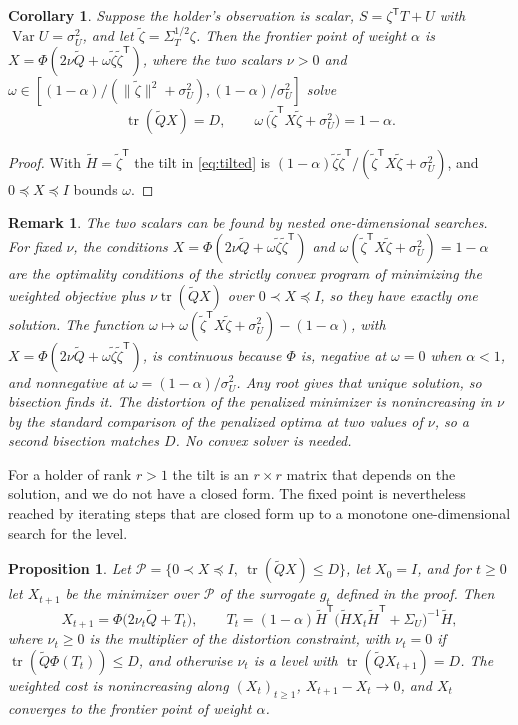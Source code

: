\documentclass[11pt,onecolumn]{IEEEtran}
\newtheorem{proposition}[theorem]{Proposition}
\newtheorem{corollary}[theorem]{Corollary}
\newtheorem{remark}[theorem]{Remark}
\newcommand{\tr}{\operatorname{tr}}
\newcommand{\Var}{\operatorname{Var}}
\begin{document}
\begin{corollary}\label{cor:scalarholder}
Suppose the holder's observation is scalar, $S=\zeta^{\mathsf T}T+U$ with
$\Var U=\sigma_U^2$, and let $\tilde\zeta=\Sigma_T^{1/2}\zeta$. Then the
frontier point of weight $\alpha$ is
$X=\Phi(2\nu\tilde Q+\omega\tilde\zeta\tilde\zeta^{\mathsf T})$, where the two
scalars $\nu>0$ and
$\omega\in[(1-\alpha)/(\|\tilde\zeta\|^2+\sigma_U^2),(1-\alpha)/\sigma_U^2]$
solve
\[
\tr(\tilde QX)=D,\qquad \omega\,\bigl(\tilde\zeta^{\mathsf T}X\tilde\zeta+\sigma_U^2\bigr)=1-\alpha .
\]
\end{corollary}

\begin{proof}
With $\tilde H=\tilde\zeta^{\mathsf T}$ the tilt in \eqref{eq:tilted} is
$(1-\alpha)\tilde\zeta\tilde\zeta^{\mathsf T}/(\tilde\zeta^{\mathsf T}X\tilde\zeta+\sigma_U^2)$,
and $0\preceq X\preceq I$ bounds $\omega$.
\end{proof}

\begin{remark}\label{rem:solver}
The two scalars can be found by nested one-dimensional searches. For
fixed $\nu$, the conditions $X=\Phi(2\nu\tilde Q+\omega\tilde\zeta\tilde\zeta^{\mathsf T})$
and $\omega(\tilde\zeta^{\mathsf T}X\tilde\zeta+\sigma_U^2)=1-\alpha$ are
the optimality conditions of the strictly convex program of minimizing
the weighted objective plus $\nu\tr(\tilde QX)$ over $0\prec X\preceq I$,
so they have exactly one solution. The function
$\omega\mapsto\omega(\tilde\zeta^{\mathsf T}X\tilde\zeta+\sigma_U^2)-(1-\alpha)$,
with $X=\Phi(2\nu\tilde Q+\omega\tilde\zeta\tilde\zeta^{\mathsf T})$, is
continuous because $\Phi$ is, negative at $\omega=0$ when $\alpha<1$, and
nonnegative at $\omega=(1-\alpha)/\sigma_U^2$. Any root gives that unique
solution, so bisection finds it. The distortion of the penalized
minimizer is nonincreasing in $\nu$ by the standard comparison of the
penalized optima at two values of $\nu$, so a second bisection matches
$D$. No convex solver is needed.
\end{remark}

For a holder of rank $r>1$ the tilt is an $r\times r$ matrix that
depends on the solution, and we do not have a closed form. The fixed
point is nevertheless reached by iterating steps that are closed form
up to a monotone one-dimensional search for the level.

\begin{proposition}\label{prop:mm}
Let $\mathcal P=\{0\prec X\preceq I,\ \tr(\tilde QX)\le D\}$, let $X_0=I$, and
for $t\ge0$ let $X_{t+1}$ be the minimizer over $\mathcal P$ of the
surrogate $g_t$ defined in the proof. Then
\[
X_{t+1}=\Phi\bigl(2\nu_t\tilde Q+T_t\bigr),\qquad
T_t=(1-\alpha)\tilde H^{\mathsf T}\bigl(\tilde HX_t\tilde H^{\mathsf T}+\Sigma_U\bigr)^{-1}\tilde H,
\]
where $\nu_t\ge0$ is the multiplier of the distortion constraint, with
$\nu_t=0$ if $\tr(\tilde Q\Phi(T_t))\le D$, and otherwise $\nu_t$ is a level
with $\tr(\tilde QX_{t+1})=D$. The weighted cost is nonincreasing along
$(X_t)_{t\ge1}$, $X_{t+1}-X_t\to0$, and $X_t$ converges to the frontier
point of weight $\alpha$.
\end{proposition}
\end{document}
